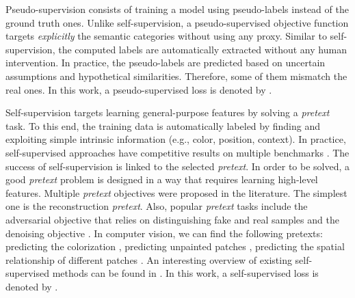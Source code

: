 \documentclass{article}
\begin{document}
Pseudo-supervision consists of training a model using pseudo-labels \cite{paper87} instead of the ground truth ones. Unlike self-supervision, a pseudo-supervised objective function targets \textit{explicitly} the semantic categories without using any proxy. Similar to self-supervision, the computed labels are automatically extracted without any human intervention. In practice, the pseudo-labels are predicted based on uncertain assumptions and hypothetical similarities. Therefore, some of them mismatch the real ones. In this work, a pseudo-supervised loss is denoted by .

Self-supervision targets learning general-purpose features by solving a \textit{pretext} task. To this end, the training data is automatically labeled by finding and exploiting simple intrinsic information (e.g., color, position, context). In practice, self-supervised approaches have competitive results on multiple benchmarks \cite{paper60, paper93}. The success of self-supervision is linked to the selected \textit{pretext}. In order to be solved, a good \textit{pretext} problem is designed in a way that requires learning high-level features. Multiple \textit{pretext} objectives were proposed in the literature. The simplest one is the reconstruction \textit{pretext}. Also, popular \textit{pretext} tasks include the adversarial objective \cite{paper1} that relies on distinguishing fake and real samples and the denoising objective \cite{paper58}. In computer vision, we can find the following pretexts: predicting the colorization \cite{paper63}, predicting unpainted patches \cite{paper62}, predicting the spatial relationship of different patches \cite{paper59}. An interesting overview of existing self-supervised methods can be found in \cite{paper94}. In this work, a self-supervised loss is denoted by .
\end{document}

